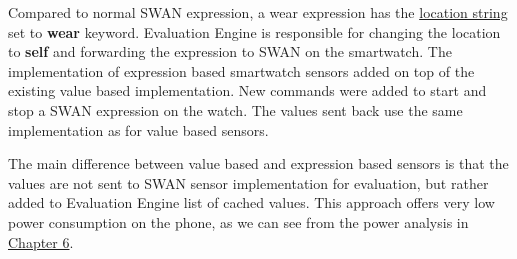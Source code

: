 Compared to normal SWAN expression, a wear expression has the \hyperref[fig:SwanExpression]{location string} set to \textbf{wear} keyword. Evaluation Engine is responsible for changing the location
to \textbf{self} and forwarding the expression to SWAN on the smartwatch.
The implementation of expression based smartwatch sensors added on top of the existing value based implementation. New commands were added to start and stop a SWAN expression on the watch.
The values sent back use the same implementation as for value based sensors. 

The main difference between value based and expression based sensors is that the values are not sent to SWAN sensor implementation for evaluation, but rather added to Evaluation Engine list of cached
values. This approach offers very low power consumption on the phone, as we can see from the power analysis in \hyperref[Chapter6]{Chapter 6}.
